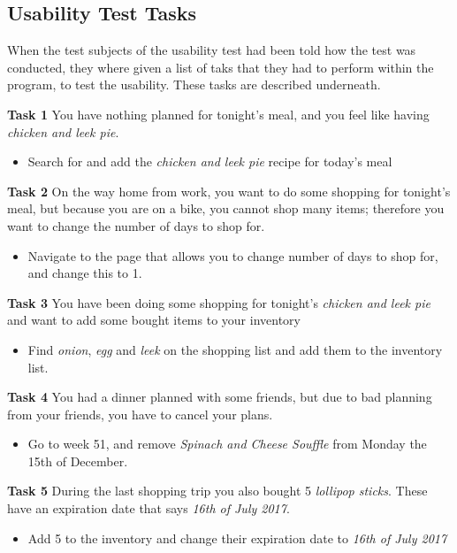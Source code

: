 \subsection{Usability Test Tasks} \label{UsabilityAppendix}

When the test subjects of the usability test had been told how the test was conducted, they where given a list of taks that they had to perform within the program, to test the usability. These tasks are described underneath.

\textbf{Task 1}
You have nothing planned for tonight's meal, and you feel like having \textit{chicken and leek pie}.
\begin{itemize}
    \item Search for and add the \textit{chicken and leek pie} recipe for today’s meal
\end{itemize}

\textbf{Task 2}
On the way home from work, you want to do some shopping for tonight’s meal, but because you are on a bike, you cannot shop many items; therefore you want to change the number of days to shop for.
\begin{itemize}
    \item Navigate to the page that allows you to change number of days to shop for, and change this to 1.
\end{itemize}

\textbf{Task 3}
You have been doing some shopping for tonight’s \textit{chicken and leek pie} and want to add some bought items to your inventory
\begin{itemize}
    \item Find \textit{onion}, \textit{egg} and \textit{leek} on the shopping list and add them to the inventory list.
\end{itemize}

\textbf{Task 4}
You had a dinner planned with some friends, but due to bad planning from your friends, you have to cancel your plans.
\begin{itemize}
    \item Go to week 51, and remove \textit{Spinach and Cheese Souffle} from Monday the 15th of December.
\end{itemize}

\textbf{Task 5}
During the last shopping trip you also bought 5 \textit{lollipop sticks}. These have an expiration date that says \textit{16th of July 2017}.
\begin{itemize}
    \item Add 5  to the inventory and change their expiration date to \textit{16th of July 2017}
\end{itemize}

